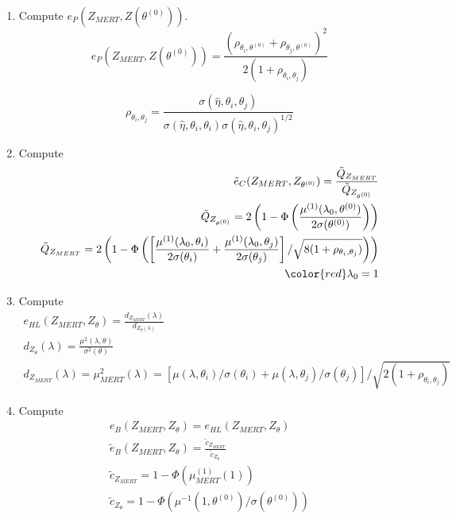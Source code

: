 \documentclass{article}
\begin{document}
\begin{enumerate}[step 1]
\item Compute $e_P(Z_{MERT},Z(\theta^{(0)}))$. $$e_P(Z_{MERT},Z(\theta^{(0)}))=\frac{(\rho_{\theta_i,\theta^{(0)}}+\rho_{\theta_j,\theta^{(0)}})^2}{2(1+\rho_{\theta_i,\theta_j})}$$

$$\rho_{\theta_i,\theta_j}= \frac{\sigma(\hat{\eta},\theta_i,\theta_j)}{{\sigma(\hat{\eta},\theta_i,\theta_i)\sigma(\hat{\eta},\theta_i,\theta_j)}^{1/2}}$$

\item Compute \begin{align*}
\tilde{e}_C(Z_{MERT},Z_{\theta^{(0)}})= \frac{ \tilde{Q}_{Z_{MERT}}}{\tilde{Q}_{Z_{\theta^{(0)}}}}\\
\tilde{Q}_{Z_{\theta^{(0)}}} =  2\left(1-\Phi\left(\frac{\mu^{(1)}(\lambda_0,\theta^{(0)})}{2\sigma(\theta^{(0)})}\right)\right)\\
\tilde{Q}_{Z_{MERT}} =  2\left(1-\Phi\left(\left[\frac{\mu^{(1)}(\lambda_0,\theta_i)}{2\sigma(\theta_i)}+\frac{\mu^{(1)}(\lambda_0,\theta_j)}{2\sigma(\theta_j)}\right]/\sqrt{8(1+\rho_{\theta_i,\theta_j})}\right)\right)\\
\color{red} \lambda_0 = 1
\end{align*}

\item Compute  \begin{align*}
 e_{HL}(Z_{MERT},Z_{\theta}) =\frac{d_{Z_{MERT}}(\lambda)}{d_{Z_{\theta}(\lambda)}}\\
 d_{Z_\theta}(\lambda) =  \frac{\mu^2(\lambda,\theta)}{\sigma^2(\theta)}\\
 d_{Z_{MERT}}(\lambda) = \mu^2_{MERT}(\lambda)= [\mu(\lambda,\theta_i)/\sigma(\theta_i)+\mu(\lambda,\theta_j)/\sigma(\theta_j)]/\sqrt{2(1+\rho_{\theta_i,\theta_j})}
\end{align*}

\item Compute  \begin{align*}
 e_{B}(Z_{MERT},Z_{\theta}) = e_{HL}(Z_{MERT},Z_{\theta})\\
 \tilde{e}_{B}(Z_{MERT},Z_{\theta}) = \frac{\tilde{c}_{Z_{MERT}}}{\tilde{c}_{Z_{\theta}}}\\
 \tilde{c}_{Z_{MERT}} = 1 - \Phi(\mu^{(1)}_{MERT}(1))\\
 \tilde{c}_{Z_{\theta}} = 1 - \Phi(\mu^{-1}(1,\theta^{(0)})/\sigma(\theta^{(0)})) 
\end{align*}
\end{enumerate}
\end{document}

